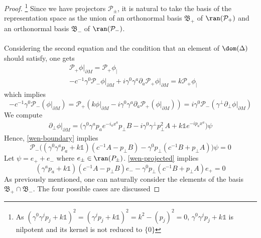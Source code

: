 \begin{proof}
\footnote{
As 
$(\gamma^0\gamma^j p_j + k \mathbb{1})^2 = (\gamma^j p_j + k\mathbb{1})^2 
= k^2 - (p_j)^2= 0$, 
$\gamma^0 \gamma^j p_j + k \mathbb{1}$
is nilpotent and its kernel is not reduced to $\{ 0 \}$
} 
Since we have projectors $\mathcal{P}_\pm$, 
it is natural to take the basis of the representation space as the union of an orthonormal basis $\mathfrak{B}_+$ of $\ran(\mathcal{P}_+)$ and an orthonormal basis $\mathfrak{B}_-$ of $\ran(\mathcal{P}_-)$. \\\\
Considering the second equation and the condition that an element of $\dom(\Delta)$ should satisfy, one gets
\begin{equation}\label{wen-boundary}
\begin{split}
& \mathcal{P}_+\phi\vert_{\partial M} = \mathcal{P}_+ \phi_| \\
& -c^{-1} \gamma^0 \mathcal{P}_- \phi\vert_{\partial M} + i\gamma^0\gamma^a\partial_a \mathcal{P}_+\phi\vert_{\partial M} = k \mathcal{P}_+ \phi_| 
\end{split}
\end{equation}
which implies
\begin{equation}\label{wen-boundary2}
-c^{-1} \gamma^0 \mathcal{P}_-(\phi\vert_{\partial M}) = 
\mathcal{P}_+(k\phi\vert_{\partial M} - i\gamma^0\gamma^a\partial_a\mathcal{P}_+(\phi\vert_{\partial M})) = 
i\gamma^0\mathcal{P}_-(\gamma^\bot\partial_\bot \phi\vert_{\partial M})
\end{equation}
We compute
\begin{equation*}
\begin{split}
\partial_\bot \phi \vert_{\partial M} = 
\big(\gamma^0\gamma^a p_a e^{-i_a x^a} p_\bot B - i\gamma^0\gamma^\bot p_\bot^2 A + k\mathbb{1}e^{-ip_a x^a}\big) \psi
\end{split}
\end{equation*}
Hence, \cref{wen-boundary} implies
\begin{equation}\label{wen-projected}
\mathcal{P}_- \Big( (\gamma^0 \gamma^a p_a + k\mathbb{1})(c^{-1} A - p_\bot B)
-\gamma^0 p_\bot(c^{-1} B + p_\bot A) \Big) \psi = 0
\end{equation}
Let $\psi = e_+ + e_-$ where $e_\pm \in \ran({P}_\pm)$.
\cref{wen-projected} implies
\begin{equation}\label{wen-projected2}
(\gamma^a p_a + k\mathbb{1})(c^{-1}A - p_\bot B) e_- - \gamma^0 p_\bot(c^{-1}B + p_\bot A) e_+ = 0
\end{equation}
As previously mentioned,
one can naturally consider the elements of the basis $\mathfrak{B}_+ \cap \mathfrak{B}_-$.
The four possible cases are discussed

\end{proof}

